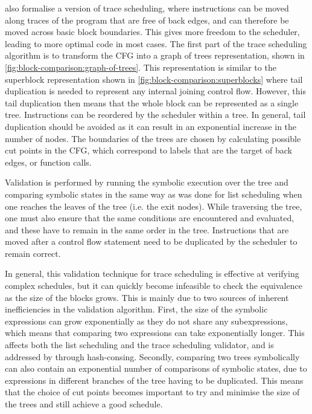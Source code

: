 \textcite{tristan08_formal_verif_trans_valid} also formalise a version of trace
scheduling, where instructions can be moved along traces of the program that are
free of back edges, and can therefore be moved across basic block boundaries.
This gives more freedom to the scheduler, leading to more optimal code in most
cases.  The first part of the trace scheduling algorithm is to transform the
\gls{CFG} into a graph of trees representation, shown in
\cref{fig:block-comparison:graph-of-trees}.  This representation is similar to
the superblock representation shown in \cref{fig:block-comparison:superblocks}
where tail duplication is needed to represent any internal joining control flow.
However, this tail duplication then means that the whole block can be
represented as a single tree.  Instructions can be reordered by the scheduler
within a tree.  In general, tail duplication should be avoided as it can result
in an exponential increase in the number of nodes.  The boundaries of the trees
are chosen by calculating possible cut points in the \gls{CFG}, which correspond
to labels that are the target of back edges, or function calls.

Validation is performed by running the symbolic execution over the tree and
comparing symbolic states in the same way as was done for list scheduling when
one reaches the leaves of the tree (i.e. the exit nodes).  While traversing the
tree, one must also ensure that the same conditions are encountered and
evaluated, and these have to remain in the same order in the tree.  Instructions
that are moved after a control flow statement need to be duplicated by the
scheduler to remain correct.

In general, this validation technique for trace scheduling is effective at
verifying complex schedules, but it can quickly become infeasible to check the
equivalence as the size of the blocks grows.  This is mainly due to two sources
of inherent inefficiencies in the validation algorithm.  First, the size of the
symbolic expressions can grow exponentially as they do not share any
subexpressions, which means that comparing two expressions can take
exponentially longer.  This affects both the list scheduling and the trace
scheduling validator, and is addressed by
\citeauthor*{six20_certif_effic_instr_sched} through hash-consing.  Secondly,
comparing two trees symbolically can also contain an exponential number of
comparisons of symbolic states, due to expressions in different branches of the
tree having to be duplicated.  This means that the choice of cut points becomes
important to try and minimise the size of the trees and still achieve a good
schedule.

